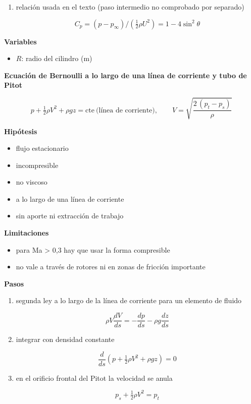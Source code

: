 \documentclass[10pt,openany]{book}
\begin{document}
\begin{tcolorbox}[title={Desarrollos del modelo}, studiumdef, breakable]
\begin{enumerate}
\[
C_p = \frac{p - p_\infty}{\tfrac12\rho U^{2}} = 1 - \frac{V^{2}}{U^{2}} = 1 - 4\sin^{2}\theta
\]
\item
relación usada en el texto (paso intermedio no comprobado por separado)

\[
C_p = (p - p_\infty)/(\tfrac12\rho U^{2}) = 1 - 4\sin^{2}\theta
\]
\end{enumerate}

\noindent\textbf{Variables}
\begin{itemize}
\item $R$: radio del cilindro ($\mathrm{m}$)
\end{itemize}



\noindent\textbf{Ecuación de Bernoulli a lo largo de una línea de corriente y tubo de Pitot}

\[
p + \tfrac12\rho V^{2} + \rho g z = \mathrm{cte}\ \text{(línea de corriente)},\qquad V = \sqrt{\frac{2\,(p_t - p_s)}{\rho}}
\]

\noindent\textbf{Hipótesis}
\begin{itemize}
\item flujo estacionario
\item incompresible
\item no viscoso
\item a lo largo de una línea de corriente
\item sin aporte ni extracción de trabajo
\end{itemize}

\noindent\textbf{Limitaciones}
\begin{itemize}
\item para Ma > 0,3 hay que usar la forma compresible
\item no vale a través de rotores ni en zonas de fricción importante
\end{itemize}

\noindent\textbf{Pasos}
\begin{enumerate}
\item
segunda ley a lo largo de la línea de corriente para un elemento de fluido

\[
\rho V\frac{dV}{ds} = -\frac{dp}{ds} - \rho g\frac{dz}{ds}
\]
\item
integrar con densidad constante

\[
\frac{d}{ds}\left(p + \tfrac12\rho V^{2} + \rho g z\right) = 0
\]
\item
en el orificio frontal del Pitot la velocidad se anula

\[
p_s + \tfrac12\rho V^{2} = p_t
\]
\end{enumerate}


\end{tcolorbox}
\end{document}

